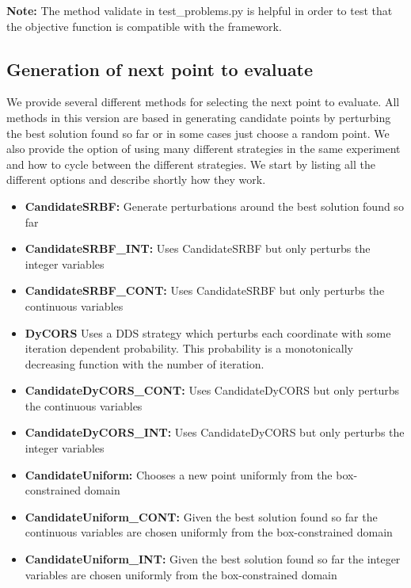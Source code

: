 \documentclass[]{article}
\begin{document}
\textbf{Note:} The method validate in test\_problems.py is helpful in order to test that the objective function is compatible with the framework. \newline


\subsection{Generation of next point to evaluate} We provide several different methods for selecting the next point to evaluate. All methods in this version are based in generating candidate points by perturbing the best solution found so far or in some cases just choose a random point. We also provide the option of using many different strategies in the same experiment and how to cycle between the different strategies. We start by listing all the different options and describe shortly how they work.
\begin{itemize}
\item \textbf{CandidateSRBF:} Generate perturbations around the best solution found so far
\item \textbf{CandidateSRBF\_INT:} Uses CandidateSRBF but only perturbs the integer variables
\item \textbf{CandidateSRBF\_CONT:} Uses CandidateSRBF but only perturbs the continuous variables
\item \textbf{DyCORS} Uses a DDS strategy which perturbs each coordinate with some iteration dependent probability. This probability is a monotonically decreasing function with the number of iteration.
\item \textbf{CandidateDyCORS\_CONT:} Uses CandidateDyCORS but only perturbs the continuous variables
\item \textbf{CandidateDyCORS\_INT:} Uses CandidateDyCORS but only perturbs the integer variables
\item \textbf{CandidateUniform:} Chooses a new point uniformly from the box-constrained domain
\item \textbf{CandidateUniform\_CONT:} Given the best solution found so far the continuous variables are chosen uniformly from the box-constrained domain
\item \textbf{CandidateUniform\_INT:} Given the best solution found so far the integer variables are chosen uniformly from the box-constrained domain
\end{itemize}
\end{document}
